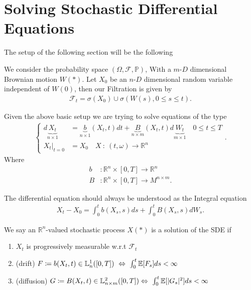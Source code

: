 \section{Solving Stochastic Differential Equations}
The setup of the following section will be the following 
\begin{definition}
 We consider the probability space $(\Omega ,\mathcal{F},\mathbb{P})$, With a $m$-$D$ dimensional Brownian motion $W(*)$.
 Let $X_0$ be an $n$-$D$ dimensional random variable independent of $W(0)$, then our Filtration is given by
 \begin{align*}
  \mathcal{F}_t = \sigma(X_{0}) \cup \sigma(W(s) , 0\le s\le t)
 .\end{align*}
\end{definition}
\begin{definition}[SDE]\label{sde}
 Given the above basic setup we are trying to solve equations of the type 
 \begin{align*}
  \begin{cases}
    d\underbrace{X_t}_{n \times 1} &= \underbrace{b}_{n \times 1}(X_t,t) dt + \underbrace{B}_{n \times m}(X_t,t) d\underbrace{W_t}_{m \times 1} \quad 0\le t\le T \\
    X_{t}\rvert_{t=0} &= X_{0} \quad X \ : \ (t,\omega ) \to  \mathbb{R}^{n} 
  \end{cases}
 .\end{align*}
 Where 
 \begin{align*}
   b &: \mathbb{R}^{n} \times [0,T] \to \mathbb{R}^{n}   \\
   B &: \mathbb{R}^{n} \times [0,T] \to  M^{n\times m}  
 .\end{align*}
\end{definition}
\begin{remark}
 The differential equation should always be understood as the Integral equation 
 \begin{align*}
  X_t - X_{0} = \int_0^{t}  b(X_s,s) ds + \int_0^{t} B(X_s,s) dW_s 
 .\end{align*}
\end{remark}
\begin{definition}[Solution]
 We say an $\mathbb{R}^{n}$-valued stochastic process $X(*)$ is a solution of the SDE if 
 \begin{enumerate}
  \item $X_t$ is progressively measurable w.r.t $\mathcal{F}_t$
  \item (drift) $F\coloneqq b(X_t,t) \in  \mathbb{L}_{n}^{1}([0,T]) \ \Leftrightarrow \  \int_0^{t} \mathbb{E}[F_s] ds < \infty $ 
  \item (diffusion) $G\coloneqq B(X_t,t) \in  \mathbb{L}_{n \times m}^{2}([0,T]) \Leftrightarrow \  \int_0^{t} \mathbb{E}[\lvert G_s\rvert^2] ds < \infty $ 
 \end{enumerate}
\end{definition}
